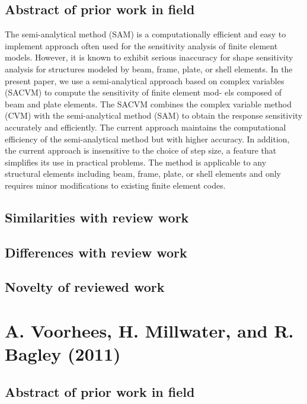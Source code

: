 \documentclass[10pt,letterpaper,draft]{article}
\begin{document}
\subsection{Abstract of prior work in field}

The semi-analytical method (SAM) is a computationally efficient and easy to
implement approach often used for the sensitivity analysis of finite element
models.  However, it is known to exhibit serious inaccuracy for shape
sensitivity analysis for structures modeled by beam, frame, plate, or shell
elements. In the present paper, we use a semi-analytical approach based on
complex variables (SACVM) to compute the sensitivity of finite element mod- els
composed of beam and plate elements. The SACVM combines the complex variable
method (CVM) with the semi-analytical method (SAM) to obtain the response
sensitivity accurately and efficiently. The current approach maintains the
computational efficiency of the semi-analytical method but with higher
accuracy. In addition, the current approach is insensitive to the choice of
step size, a feature that simplifies its use in practical problems. The method
is applicable to any structural elements including beam, frame, plate, or shell
elements and only requires minor modifications to existing finite element
codes.

\subsection{Similarities with review work}
\subsection{Differences with review work}
\subsection{Novelty of reviewed work}

\section{A. Voorhees, H. Millwater, and R. Bagley (2011)}
\subsection{Abstract of prior work in field}
\end{document}
